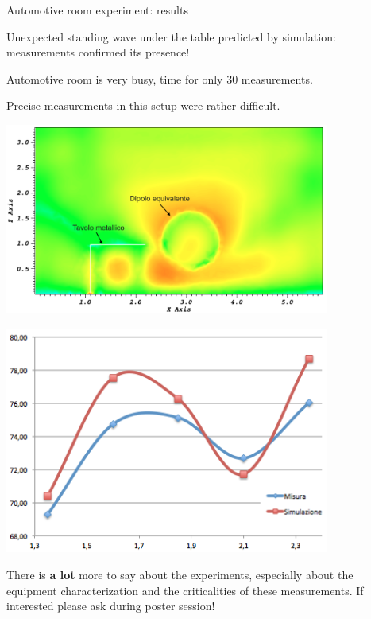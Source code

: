 \documentclass{beamer}
\begin{document}
\begin{frame}{Automotive room experiment: results}
    \footnotesize
    \begin{minipage}{0.48\textwidth}
        Unexpected standing wave under the table predicted by simulation:  measurements confirmed its presence!

        \vspace{5mm}

    Automotive room is very busy, time for only 30 measurements.

    \vspace{5mm}

    Precise measurements in this setup were rather difficult.

    \end{minipage}
    \hfill
    \begin{minipage}{0.48\textwidth}

        \includegraphics[width=0.8\textwidth]{img/camera_alse}

        \includegraphics[width=0.8\textwidth]{img/campo_alse}

    \end{minipage}

    \vspace{5mm}

    \textcolor{uniud-orange}{There is \textbf{a lot} more to say about the experiments, especially about the equipment characterization and the criticalities of these measurements. If interested please ask during poster session!}

\end{frame}
\end{document}
